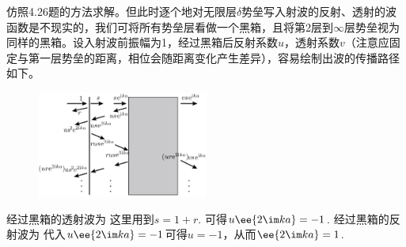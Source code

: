 \begin{enumerate}[label=\textbf{4.\arabic*}, listparindent=\parindent]
仿照4.26题的方法求解。但此时逐个地对无限层$\delta$势垒写入射波的反射、透射的波函数是不现实的，我们可将所有势垒层看做一个黑箱，且将第2层到$\infty$层势垒视为同样的黑箱。设入射波前振幅为1，经过黑箱后反射系数$u$，透射系数$v$（注意应固定与第一层势垒的距离，相位会随距离变化产生差异），容易绘制出波的传播路径如下。
\begin{figure}[!ht]
    \centering
    \includegraphics[width=0.5\textwidth]{pic/delta2.JPG}
    \label{fig:my_label}
\end{figure}

经过黑箱的透射波为
这里用到$s=1+r$. 可得$u\ee{2\im ka}=-1$. 经过黑箱的反射波为
代入$u\ee{2\im ka}=-1$可得$u=-1$，从而$\ee{2\im ka}=1$.

\end{enumerate}


